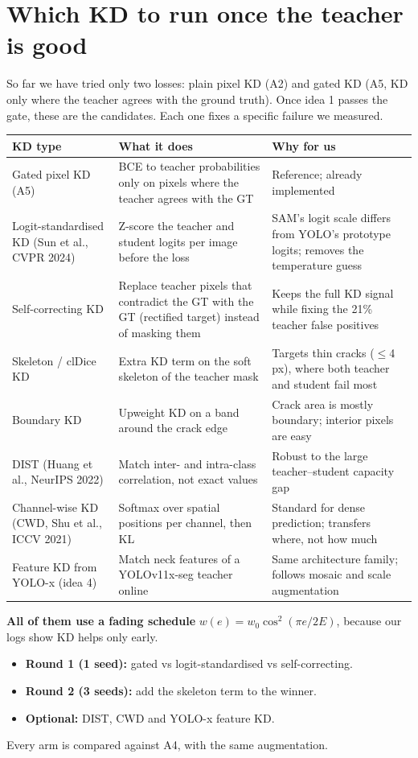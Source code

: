 \documentclass[11pt,a4paper]{article}
\begin{document}
\section{Which KD to run once the teacher is good}
So far we have tried only two losses: plain pixel KD (A2) and gated KD (A5, KD only where the teacher agrees with the ground truth).
Once idea 1 passes the gate, these are the candidates. Each one fixes a specific failure we measured.
\begin{center}\small
\begin{tabular}{p{3.4cm}p{6.2cm}p{5.2cm}}
\toprule
KD type & What it does & Why for us\\
\midrule
Gated pixel KD (A5) & BCE to teacher probabilities only on pixels where the teacher agrees with the GT & Reference; already implemented\\
Logit-standardised KD (Sun et al., CVPR 2024) & Z-score the teacher and student logits per image before the loss & SAM's logit scale differs from YOLO's prototype logits; removes the temperature guess\\
Self-correcting KD & Replace teacher pixels that contradict the GT with the GT (rectified target) instead of masking them & Keeps the full KD signal while fixing the 21\% teacher false positives\\
Skeleton / clDice KD & Extra KD term on the soft skeleton of the teacher mask & Targets thin cracks ($\le$4\,px), where both teacher and student fail most\\
Boundary KD & Upweight KD on a band around the crack edge & Crack area is mostly boundary; interior pixels are easy\\
DIST (Huang et al., NeurIPS 2022) & Match inter- and intra-class correlation, not exact values & Robust to the large teacher--student capacity gap\\
Channel-wise KD (CWD, Shu et al., ICCV 2021) & Softmax over spatial positions per channel, then KL & Standard for dense prediction; transfers where, not how much\\
Feature KD from YOLO-x (idea 4) & Match neck features of a YOLOv11x-seg teacher online & Same architecture family; follows mosaic and scale augmentation\\
\bottomrule
\end{tabular}\end{center}
\textbf{All of them use a fading schedule} $w(e)=w_0\cos^2(\pi e/2E)$, because our logs show KD helps only early.
\begin{itemize}
\item \textbf{Round 1 (1 seed):} gated vs logit-standardised vs self-correcting.
\item \textbf{Round 2 (3 seeds):} add the skeleton term to the winner.
\item \textbf{Optional:} DIST, CWD and YOLO-x feature KD.
\end{itemize}
Every arm is compared against A4, with the same augmentation.
\end{document}
